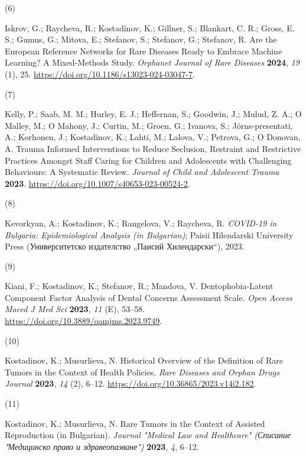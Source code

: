 \documentclass[
  12pt,
  letterpaper,
  DIV=11,
  numbers=noendperiod]{scrartcl}
\newlength{\cslhangindent}
\newlength{\csllabelwidth}
\newenvironment{CSLReferences}[2] %
 {\begin{list}{}{%
  \setlength{\itemindent}{0pt}
  \setlength{\leftmargin}{0pt}
  \setlength{\parsep}{0pt}
  \ifodd #1
   \setlength{\leftmargin}{\cslhangindent}
   \setlength{\itemindent}{-1\cslhangindent}
  \fi
  \setlength{\itemsep}{#2\baselineskip}}}
 {\end{list}}
\newcommand{\CSLLeftMargin}[1]{\parbox[t]{\csllabelwidth}{\strut#1\strut}}
\newcommand{\CSLRightInline}[1]{\parbox[t]{\linewidth - \csllabelwidth}{\strut#1\strut}}
\begin{document}
\begin{CSLReferences}{0}{0}
\CSLLeftMargin{(6) }%
\CSLRightInline{Iskrov, G.; Raycheva, R.; Kostadinov, K.; Gillner, S.;
Blankart, C. R.; Gross, E. S.; Gumus, G.; Mitova, E.; Stefanov, S.;
Stefanov, G.; Stefanov, R. Are the European Reference Networks for Rare
Diseases Ready to Embrace Machine Learning? A Mixed-Methods Study.
\emph{Orphanet Journal of Rare Diseases} \textbf{2024}, \emph{19} (1),
25. \url{https://doi.org/10.1186/s13023-024-03047-7}.}

\CSLLeftMargin{(7) }%
\CSLRightInline{Kelly, P.; Saab, M. M.; Hurley, E. J.; Heffernan, S.;
Goodwin, J.; Mulud, Z. A.; O Malley, M.; O Mahony, J.; Curtin, M.;
Groen, G.; Ivanova, S.; Jörns-presentati, A.; Korhonen, J.; Kostadinov,
K.; Lahti, M.; Lalova, V.; Petrova, G.; O Donovan, A. Trauma Informed
Interventions to Reduce Seclusion, Restraint and Restrictive Practices
Amongst Staff Caring for Children and Adolescents with Challenging
Behaviours: A Systematic Review. \emph{Journal of Child and Adolescent
Trauma} \textbf{2023}.
\url{https://doi.org/10.1007/s40653-023-00524-2}.}

\CSLLeftMargin{(8) }%
\CSLRightInline{Kevorkyan, A.; Kostadinov, K.; Rangelova, V.; Raycheva,
R. \emph{COVID-19 in Bulgaria: Epidemiological Analysis (in Bulgarian)};
Paisii Hilendarski University Press (Университетско издателство „Паисий
Хилендарски``), 2023.}

\CSLLeftMargin{(9) }%
\CSLRightInline{Kiani, F.; Kostadinov, K.; Stefanov, R.; Mandova, V.
Dentophobia-Latent Component Factor Analysis of Dental Concerns
Assessment Scale. \emph{Open Access Maced J Med Sci} \textbf{2023},
\emph{11} (E), 53--58. \url{https://doi.org/10.3889/oamjms.2023.9749}.}

\CSLLeftMargin{(10) }%
\CSLRightInline{Kostadinov, K.; Musurlieva, N. Historical Overview of
the Definition of Rare Tumors in the Context of Health Policies.
\emph{Rare Diseases and Orphan Drugs Journal} \textbf{2023}, \emph{14}
(2), 6--12. \url{https://doi.org/10.36865/2023.v14i2.182}.}

\CSLLeftMargin{(11) }%
\CSLRightInline{Kostadinov, K.; Musurlieva, N. Rare Tumors in the
Context of Assisted Reproduction (in Bulgarian). \emph{Journal "Medical
Law and Healthcare" (Списание "Медицинско право и здравеопазване")}
\textbf{2023}, \emph{4}, 6--12.}


\end{CSLReferences}
\end{document}
